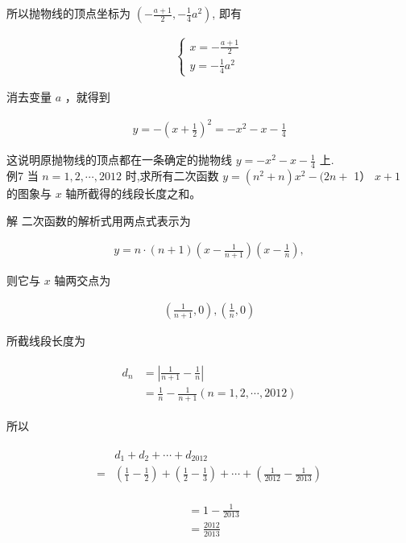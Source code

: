\documentclass[10pt]{article}
\begin{document}
所以抛物线的顶点坐标为 $\left(-\frac{a+1}{2},-\frac{1}{4} a^{2}\right)$, 即有

\begin{align*}
\left\{\begin{array}{l}
x=-\frac{a+1}{2} \\
y=-\frac{1}{4} a^{2}
\end{array}\right.
\end{align*}

消去变量 $a$ ，就得到

\begin{align*}
y=-\left(x+\frac{1}{2}\right)^{2}=-x^{2}-x-\frac{1}{4}
\end{align*}

这说明原抛物线的顶点都在一条确定的抛物线 $y=-x^{2}-x-\frac{1}{4}$ 上.\\
例7 当 $n=1,2, \cdots, 2012$ 时,求所有二次函数 $y=\left(n^{2}+n\right) x^{2}-(2 n+$ 1） $x+1$ 的图象与 $x$ 轴所截得的线段长度之和。

解 二次函数的解析式用两点式表示为

\begin{align*}
y=n \cdot(n+1)\left(x-\frac{1}{n+1}\right)\left(x-\frac{1}{n}\right),
\end{align*}

则它与 $x$ 轴两交点为

\begin{align*}
\left(\frac{1}{n+1}, 0\right),\left(\frac{1}{n}, 0\right)
\end{align*}

所截线段长度为

\begin{align*}
\begin{aligned}
d_{n} & =\left|\frac{1}{n+1}-\frac{1}{n}\right| \\
& =\frac{1}{n}-\frac{1}{n+1}(n=1,2, \cdots, 2012)
\end{aligned}
\end{align*}

所以

\begin{align*}
\begin{aligned}
& d_{1}+d_{2}+\cdots+d_{2012} \\
= & \left(\frac{1}{1}-\frac{1}{2}\right)+\left(\frac{1}{2}-\frac{1}{3}\right)+\cdots+\left(\frac{1}{2012}-\frac{1}{2013}\right)
\end{aligned}
\end{align*}

\begin{align*}
\begin{aligned}
& =1-\frac{1}{2013} \\
& =\frac{2012}{2013}
\end{aligned}
\end{align*}
\end{document}

